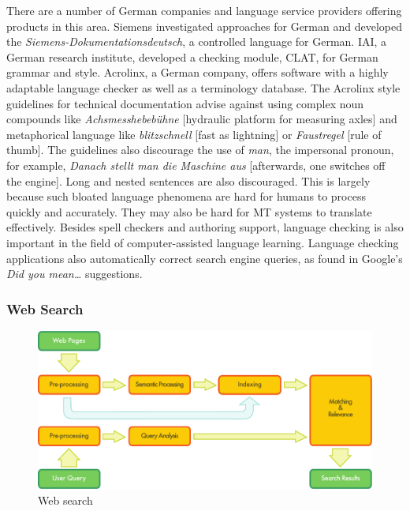 \documentclass[]{../../metanetpaper}
\begin{document}
\begin{multicols}{2}

There are a number of German companies and language service providers offering products in this area. Siemens investigated approaches for German and developed the \textit{Siemens-Dokumentationsdeutsch}, a controlled language for German. IAI, a German research institute, developed a checking module, CLAT, for German grammar and style. Acrolinx, a German company, offers software with a highly adaptable language checker as well as a terminology database. The Acrolinx style guidelines for technical documentation advise against using complex noun compounds like \textit{Achsmesshebebühne} {[}hydraulic platform for measuring axles{]} and metaphorical language like \textit{blitzschnell} {[}fast as lightning{]} or \textit{Faustregel} {[}rule of thumb{]}. The guidelines also discourage the use of \textit{man}, the impersonal pronoun, for example, \textit{Danach stellt man die Maschine aus} {[}afterwards, one switches off the engine{]}. Long and nested sentences are also discouraged. This is largely because such bloated language phenomena are hard for humans to process quickly and accurately. They may also be hard for MT systems to translate effectively.
Besides spell checkers and authoring support, language checking is also important in the field of computer-assisted language learning. Language checking applications also automatically correct search engine queries, as found in Google's \textit{Did you mean…} suggestions.

\subsubsection{Web Search}

\begin{figure}[htb]
  \center
  \includegraphics[width=\textwidth]{../_media/english/web_search_architecture}
  \caption{Web search}
  \label{fig:websearcharch_en}
 \end{figure}


\end{multicols}
\end{document}
